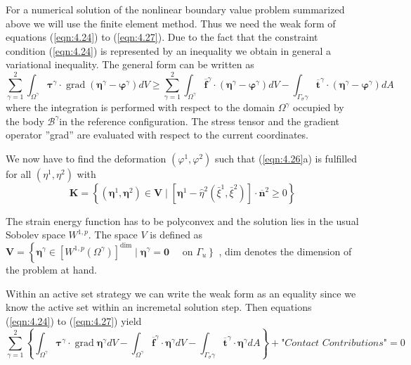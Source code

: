 For a numerical solution of the nonlinear boundary value problem summarized above we
will use the ﬁnite element method. Thus we need the weak form of equations (\ref{eqn:4.24}) to (\ref{eqn:4.27}).
Due to the fact that the constraint condition (\ref{eqn:4.24}) is represented by an inequality we obtain
in general a variational inequality. The general form can be written as
\begin{equation}
 \sum_{\gamma=1}^{2} \int_{\Omega^{\gamma}} \boldsymbol{\tau}^{\gamma} \cdot \operatorname{grad}\left(\boldsymbol{\eta}^{\gamma}-\boldsymbol{\varphi}^{\gamma}\right) d V \geq \sum_{\gamma=1}^{2} \int_{\Omega^{\gamma}} \overline{\mathbf{f}}^{\gamma} \cdot\left(\boldsymbol{\eta}^{\gamma}-\boldsymbol{\varphi}^{\gamma}\right) d V-\int_{\Gamma_{\sigma} \gamma} \overline{\mathbf{t}}^{\gamma} \cdot\left(\boldsymbol{\eta}^{\gamma}-\boldsymbol{\varphi}^{\gamma}\right) d A 
 \label{eqn:4.28} 
\end{equation}
where the integration is performed with respect to the domain $\Omega^ \gamma$ occupied by the body
$\mathcal{B}^ \gamma $in the reference conﬁguration. The stress tensor and the gradient operator ”grad” are
evaluated with respect to the current coordinates.

We now have to ﬁnd the deformation $(\varphi^1,\varphi^2)$ such that (\ref{eqn:4.26}a) is fulﬁlled for all $(\eta^1,\eta^2)$ with
\begin{equation}
 \mathbf{K}=\left\{\left(\boldsymbol{\eta}^{1}, \boldsymbol{\eta}^{2}\right) \in \mathbf{V} \mid\left[\boldsymbol{\eta}^{1}-\hat{\eta}^{2}\left(\bar{\xi}^{1}, \bar{\xi}^{2}\right)\right] \cdot \overline{\mathbf{n}}^{2} \geq 0\right\} 
\end{equation}

The strain energy function has to be polyconvex and the solution lies in the usual Sobolev space $W ^{1,p} $.
The space $V$ is deﬁned as $\mathbf{V}=\left\{\boldsymbol{\eta}^{\gamma} \in\left[W^{1, p}\left(\Omega^{\gamma}\right)\right]^{\operatorname{dim}} \mid \boldsymbol{\eta}^{\gamma}=\mathbf{0} \quad\right. $ on $ \left.\Gamma_{u}\right\}$ , dim denotes the dimension of the problem at hand.

Within an active set strategy we can write the weak form as an equality since we know
the active set within an incremetal solution step. Then equations (\ref{eqn:4.24}) to (\ref{eqn:4.27}) yield
\begin{equation}
     \sum_{\gamma=1}^{2}\left\{\int_{\Omega^{\gamma}} \boldsymbol{\tau}^{\gamma} \cdot \operatorname{grad} \boldsymbol{\eta}^{\gamma} d V-\int_{\Omega ^\gamma} \overline{\mathbf{f}}^{\gamma} \cdot \boldsymbol{\eta}^{\gamma} d V-\int_{\Gamma_{\sigma} \gamma} \overline{\mathbf{t}}^{\gamma} \cdot \boldsymbol{\eta}^{\gamma} d A\right\} 
 + \textit{"Contact Contributions"}  =0
 \label{eqn:4.30} 
\end{equation}

